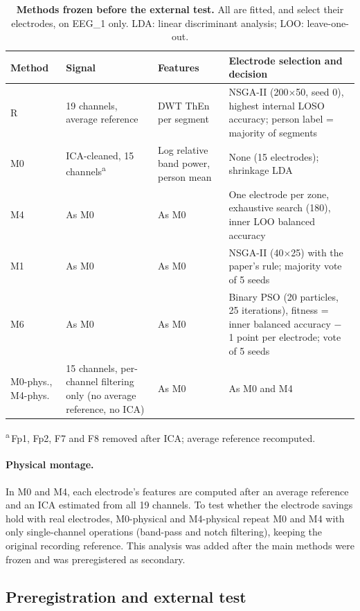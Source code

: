 \begin{table}[t]
\centering\footnotesize
\caption{\textbf{Methods frozen before the external test.} All are fitted, and select their electrodes, on EEG\_1 only. LDA: linear discriminant analysis; LOO: leave-one-out.}
\label{tab:methods}
\begin{tabular}{@{}p{1.7cm}p{3.6cm}p{3.1cm}p{5.4cm}@{}}
\toprule
Method & Signal & Features & Electrode selection and decision \\
\midrule
R & 19 channels, average reference & DWT ThEn per segment & NSGA-II (200$\times$50, seed 0), highest internal LOSO accuracy; person label = majority of segments \\
M0 & ICA-cleaned, 15 channels\textsuperscript{a} & Log relative band power, person mean & None (15 electrodes); shrinkage LDA \\
M4 & As M0 & As M0 & One electrode per zone, exhaustive search (180), inner LOO balanced accuracy \\
M1 & As M0 & As M0 & NSGA-II (40$\times$25) with the paper's rule; majority vote of 5 seeds \\
M6 & As M0 & As M0 & Binary PSO (20 particles, 25 iterations), fitness = inner balanced accuracy $-$ 1 point per electrode; vote of 5 seeds \\
M0-phys., M4-phys. & 15 channels, per-channel filtering only (no average reference, no ICA) & As M0 & As M0 and M4 \\
\bottomrule
\end{tabular}

\smallskip\raggedright \textsuperscript{a}\,Fp1, Fp2, F7 and F8 removed after ICA; average reference recomputed.
\end{table}

\paragraph{Physical montage.} In M0 and M4, each electrode's features are computed after an average reference and an ICA estimated from all 19 channels. To test whether the electrode savings hold with real electrodes, M0-physical and M4-physical repeat M0 and M4 with only single-channel operations (band-pass and notch filtering), keeping the original recording reference. This analysis was added after the main methods were frozen and was preregistered as secondary.

\subsection{Preregistration and external test}

